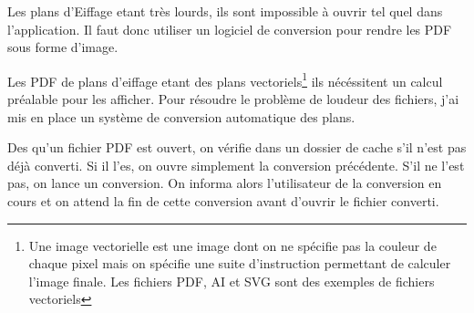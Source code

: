 Les plans d'Eiffage etant très lourds, ils sont impossible à ouvrir tel quel dans l'application.
Il faut donc utiliser un logiciel de conversion pour rendre les PDF sous forme d'image.

Les PDF de plans d'eiffage etant des plans vectoriels\footnote{Une image vectorielle est une image dont on ne spécifie pas la couleur de chaque pixel mais on spécifie une suite d'instruction permettant de calculer l'image finale. Les fichiers PDF, AI et SVG sont des exemples de fichiers vectoriels} ils nécéssitent un calcul préalable pour les afficher.
Pour résoudre le problème de loudeur des fichiers, j'ai mis en place un système de conversion automatique des plans.

\bigskip

Des qu'un fichier PDF est ouvert, on vérifie dans un dossier de cache s'il n'est pas déjà converti.
Si il l'es, on ouvre simplement la conversion précédente.
S'il ne l'est pas, on lance un conversion.
On informa alors l'utilisateur de la conversion en cours et on attend la fin de cette conversion avant d'ouvrir le fichier converti.

